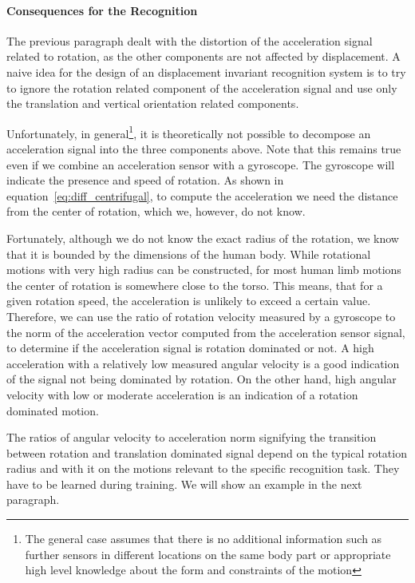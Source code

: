 \paragraph{Consequences for the Recognition} The previous paragraph dealt with the distortion of the acceleration signal
related to rotation, as the other components are not affected by
displacement. A naive idea for the design of an displacement
invariant recognition system is to try to ignore the rotation
related component of the acceleration signal and use only the 
translation and vertical orientation related components.

Unfortunately, in general\footnote{The general case assumes that there
  is no additional information such as 
further sensors in different locations on the same body part or appropriate high level knowledge about the
form and constraints of the motion}, it is theoretically not possible  
to decompose an acceleration signal into the three components above. 
Note that this remains true
even if we combine an acceleration sensor with a gyroscope.  The
gyroscope will indicate the presence and speed of rotation.
As shown in equation~\ref{eq:diff_centrifugal}, to compute the
acceleration we need the distance from the center of rotation, which we, however,
do not know.

Fortunately, although we do not know the exact radius of the
rotation, we know that it is bounded by the dimensions of the human
body. While rotational motions with very high radius can be
constructed, for most human limb motions the center of rotation is
somewhere close to the torso.  This means, that for a given rotation
speed, the acceleration is unlikely to exceed a certain value. Therefore, 
we can use the ratio of rotation velocity measured by
a gyroscope to the norm of the acceleration vector computed from the
acceleration sensor signal, to determine if the acceleration signal is
rotation dominated or not. A high acceleration with a relatively low
measured angular velocity is a good indication of the signal not being
dominated by rotation. On the other hand, high angular velocity with
low or moderate acceleration is an indication of a rotation dominated
motion.

The ratios of angular velocity to acceleration norm
signifying the transition between rotation and translation dominated signal
depend on the typical rotation radius and with it on the 
motions relevant to the specific recognition task. They have to be learned 
during training. We will show an example in the next paragraph. 

